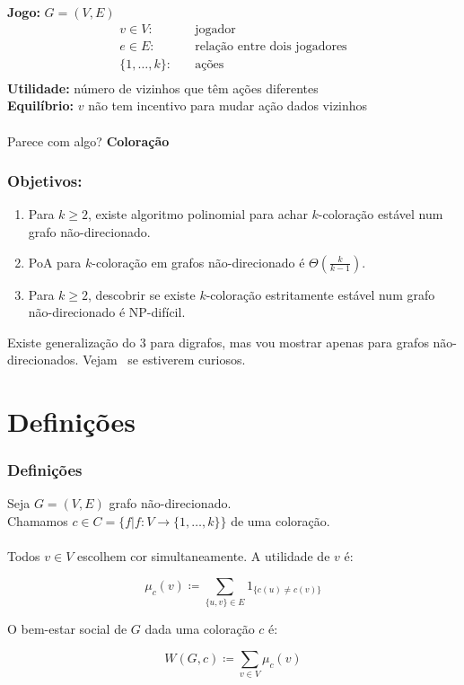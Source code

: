 \documentclass{beamer}
\theoremstyle{plain}
\newcommand{\p}{\pause}
\begin{document}
\begin{frame}
  \textbf{Jogo:} $G=(V,E)$\\
  \begin{align*}
    v\in V:\quad &\text{jogador}\\
    e\in E:\quad &\text{relação entre dois jogadores}\\
    \{1,\ldots,k\}:\quad &\text{ações}\\
  \end{align*}
  \textbf{Utilidade:} número de vizinhos que têm ações diferentes\\
  \textbf{Equilíbrio:} $v$ não tem incentivo para mudar ação dados vizinhos\\~\\

  Parece com algo?\p{} \textbf{Coloração}
\end{frame}

\begin{frame}
  \frametitle{Objetivos:}
  \begin{enumerate}
    \item Para $k\geq 2$, existe algoritmo polinomial para achar $k$-coloração estável num grafo
      não-direcionado.
    \item PoA para $k$-coloração em grafos não-direcionado é $\Theta\left(\frac{k}{k-1}\right)$.
    \item Para $k\geq 2$, descobrir se existe $k$-coloração estritamente estável num grafo
      não-direcionado é NP-difícil.
  \end{enumerate}

  Existe generalização do 3 para digrafos, mas vou mostrar apenas para grafos não-direcionados.
  Vejam~\cite{kun-et-al} se estiverem curiosos.
\end{frame}

\section{Definições}

\begin{frame}
  \frametitle{Definições}
  Seja $G=(V,E)$ grafo não-direcionado.\\
  Chamamos $c\in C=\{f|f:V\to\{1,\ldots,k\}\}$ de uma coloração.\\~\\

  Todos $v\in V$ escolhem cor simultaneamente. A utilidade de $v$ é:

  \begin{equation*}
    \mu_c(v) \coloneqq \sum_{\{u,v\}\in E} 1_{\{c(u)\neq c(v)\}}
  \end{equation*}

  O bem-estar social de $G$ dada uma coloração $c$ é:

  \begin{equation*}
    W(G,c)\coloneqq\sum_{v\in V}\mu_c(v)
  \end{equation*}
\end{frame}
\end{document}
